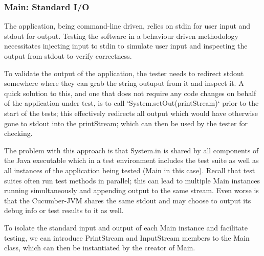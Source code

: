 \subsubsection{Main: Standard I/O}
The application, being command-line driven, relies on stdin for user input and stdout for output. Testing the software in a behaviour driven methodology necessitates injecting input to stdin to simulate user input and inspecting the output from stdout to verify correctness. 
\par
To validate the output of the application, the tester needs to redirect stdout somewhere where they can grab the string outuput from it and inspect it. A quick solution to this, and one that does not require any code changes on behalf of the application under test, is to call `System.setOut(printStream)` prior to the start of the tests; this effectively redirects all output which would have otherwise gone to stdout into the printStream; which can then be used by the tester for checking. 
\par
The problem with this approach is that System.in is shared by all components of the Java executable which in a test environment includes the test suite as well as all instances of the application being tested (Main in this case). Recall that test suites often run test methods in parallel; this can lead to multiple Main instances running simultaneously and appending output to the same stream. Even worse is that the Cucumber-JVM shares the same stdout and may choose to output its debug info or test results to it as well. 
\par 
To isolate the standard input and output of each Main instance and facilitate testing, we can introduce PrintStream and InputStream members to the Main class, which can then be instantiated by the creator of Main. 




